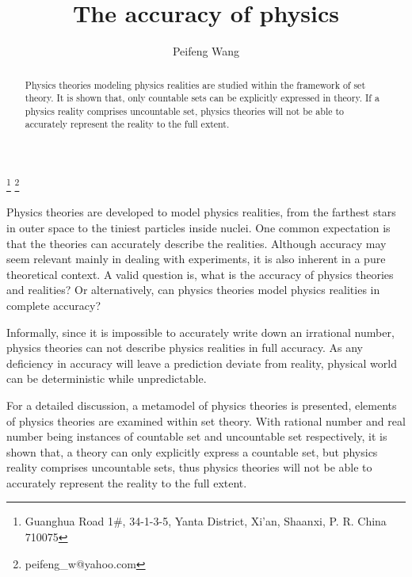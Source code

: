 \documentclass{amsart}
\theoremstyle{definition}
\theoremstyle{remark}
\numberwithin{equation}{section}
\begin{document}
\title{The accuracy of physics}


\author{Peifeng Wang}
\address{Guanghua Road 1\#, 34-1-3-5, Yanta District, Xi'an, Shaanxi, P. R. China 710075}
\curraddr{}
\thanks{Guanghua Road 1\#, 34-1-3-5, Yanta District, Xi'an, Shaanxi, P. R. China 710075}
\thanks{peifeng\_w@yahoo.com}



\keywords{}

\date{}

\dedicatory{}

\begin{abstract}
Physics theories modeling physics realities are studied within the framework of set theory. It is shown that, only countable sets can be explicitly expressed in theory. If a physics reality comprises uncountable set, physics theories will not be able to accurately represent the reality to the full extent.
\end{abstract}

\maketitle

Physics theories are developed to model physics realities, from the farthest stars in outer space to the tiniest particles inside nuclei. One common expectation is that the theories can accurately describe the realities. Although accuracy may seem relevant mainly in dealing with experiments, it is also inherent in a pure theoretical context. A valid question is, what is the accuracy of physics theories and realities? Or alternatively, can physics theories model physics realities in complete accuracy?

Informally, since it is impossible to accurately write down an irrational number, physics theories can not describe physics realities in full accuracy. As any deficiency in accuracy will leave a prediction deviate from reality, physical world can be deterministic while unpredictable.

For a detailed discussion, a metamodel of physics theories is presented, elements of physics theories are examined within set theory. With rational number and real number being instances of countable set and uncountable set respectively, it is shown that, a theory can only explicitly express a countable set, but physics reality comprises uncountable sets, thus physics theories will not be able to accurately represent the reality to the full extent.
\end{document}
